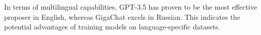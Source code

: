 \documentclass{article}
\begin{document}
In terms of multilingual capabilities, GPT-3.5 has proven to be the most effective proposer in English, whereas GigaChat excels in Russian. This indicates the potential advantages of training models on language-specific datasets.






\end{document}

